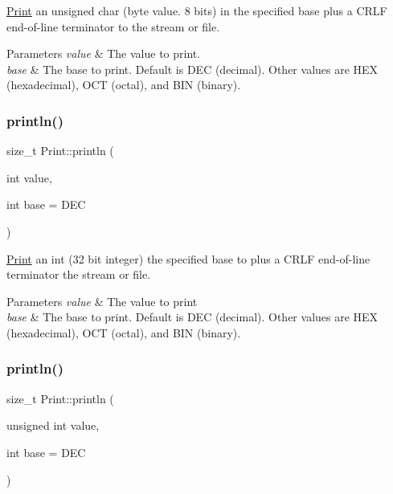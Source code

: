 \mbox{\hyperlink{class_print}{Print}} an unsigned char (byte value. 8 bits) in the specified base plus a C\+R\+LF end-\/of-\/line terminator to the stream or file. 


\begin{DoxyParams}{Parameters}
{\em value} & The value to print. \\
\hline
{\em base} & The base to print. Default is D\+EC (decimal). Other values are H\+EX (hexadecimal), O\+CT (octal), and B\+IN (binary). \\
\hline
\end{DoxyParams}
\mbox{\label{class_print_a82aa91bbd859f28a0a3b4869e5bfcadd}} 
\subsubsection{\texorpdfstring{println()}{println()}\hspace{0.1cm}{\footnotesize\ttfamily [2/6]}}
{\footnotesize\ttfamily size\+\_\+t Print\+::println (\begin{DoxyParamCaption}\item[{int}]{value,  }\item[{int}]{base = {\ttfamily DEC} }\end{DoxyParamCaption})}



\mbox{\hyperlink{class_print}{Print}} an int (32 bit integer) the specified base to plus a C\+R\+LF end-\/of-\/line terminator the stream or file. 


\begin{DoxyParams}{Parameters}
{\em value} & The value to print \\
\hline
{\em base} & The base to print. Default is D\+EC (decimal). Other values are H\+EX (hexadecimal), O\+CT (octal), and B\+IN (binary). \\
\hline
\end{DoxyParams}
\mbox{\label{class_print_a2608232c1f10f654111ff447de16d60b}} 
\subsubsection{\texorpdfstring{println()}{println()}\hspace{0.1cm}{\footnotesize\ttfamily [3/6]}}
{\footnotesize\ttfamily size\+\_\+t Print\+::println (\begin{DoxyParamCaption}\item[{unsigned int}]{value,  }\item[{int}]{base = {\ttfamily DEC} }\end{DoxyParamCaption})}



